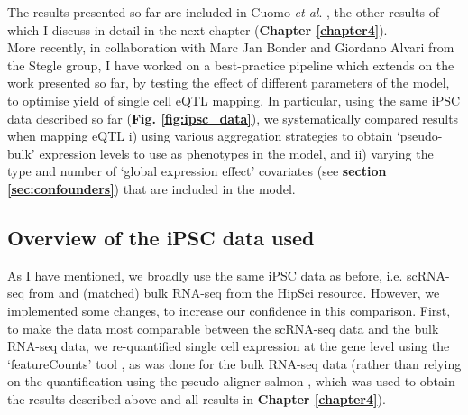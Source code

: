 The results presented so far are included in Cuomo \textit{et al}. \cite{cuomo2020single}, the other results of which I discuss in detail in the next chapter (\textbf{Chapter 
\ref{chapter4}}). \\

More recently, in collaboration with Marc Jan Bonder and Giordano Alvari from the Stegle group, I have worked on a best-practice pipeline which extends on the work presented so far, by testing the effect of different parameters of the model, to optimise yield of single cell eQTL mapping.
In particular, using the same iPSC data described so far (\textbf{Fig. \ref{fig:ipsc_data}}), we systematically compared results when mapping eQTL i) using various aggregation strategies to obtain `pseudo-bulk' expression levels to use as phenotypes in the model, and ii) varying the type and number of `global expression effect' covariates (see \textbf{section
\ref{sec:confounders}})
that are included in the model.

\subsection{Overview of the iPSC data used}

As I have mentioned, we broadly use the same iPSC data as before, i.e. scRNA-seq from \cite{cuomo2020single} and (matched) bulk RNA-seq from the HipSci resource.
However, we implemented some changes, to increase our confidence in this comparison. 
First, to make the data most comparable between the scRNA-seq data and the bulk RNA-seq data, we re-quantified single cell expression at the gene level using the `featureCounts' tool \cite{liao2014featurecounts}, as was done for the bulk RNA-seq data (rather than relying on the quantification using the pseudo-aligner salmon \cite{patro2017salmon}, which was used to obtain the results described above and all results in \textbf{Chapter \ref{chapter4}}).
\\



